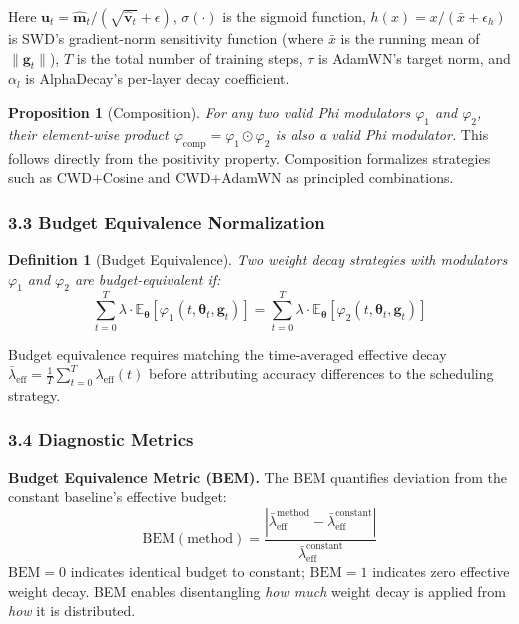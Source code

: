 \documentclass[
]{article}
\begin{document}
Here
\(\mathbf{u}_t = \hat{\mathbf{m}}_t / (\sqrt{\hat{\mathbf{v}}_t} + \epsilon)\),
\(\sigma(\cdot)\) is the sigmoid function,
\(h(x) = x / (\bar{x} + \epsilon_h)\) is SWD's gradient-norm sensitivity
function (where \(\bar{x}\) is the running mean of
\(\|\mathbf{g}_t\|\)), \(T\) is the total number of training steps,
\(\tau\) is AdamWN's target norm, and \(\alpha_l\) is AlphaDecay's
per-layer decay coefficient.

\textbf{Proposition 1} (Composition). \emph{For any two valid Phi
modulators \(\varphi_1\) and \(\varphi_2\), their element-wise product
\(\varphi_{\mathrm{comp}} = \varphi_1 \odot \varphi_2\) is also a valid
Phi modulator.} This follows directly from the positivity property.
Composition formalizes strategies such as CWD+Cosine and CWD+AdamWN as
principled combinations.

\hypertarget{budget-equivalence-normalization}{%
\subsubsection{3.3 Budget Equivalence
Normalization}\label{budget-equivalence-normalization}}

\textbf{Definition 1} (Budget Equivalence). \emph{Two weight decay
strategies with modulators \(\varphi_1\) and \(\varphi_2\) are
budget-equivalent if:} \[
\sum_{t=0}^{T} \lambda \cdot \mathbb{E}_{\boldsymbol{\theta}}[\varphi_1(t, \boldsymbol{\theta}_t, \mathbf{g}_t)] = \sum_{t=0}^{T} \lambda \cdot \mathbb{E}_{\boldsymbol{\theta}}[\varphi_2(t, \boldsymbol{\theta}_t, \mathbf{g}_t)]
\]

Budget equivalence requires matching the time-averaged effective decay
\(\bar{\lambda}_{\mathrm{eff}} = \frac{1}{T}\sum_{t=0}^{T}\lambda_{\mathrm{eff}}(t)\)
before attributing accuracy differences to the scheduling strategy.

\hypertarget{diagnostic-metrics}{%
\subsubsection{3.4 Diagnostic Metrics}\label{diagnostic-metrics}}

\textbf{Budget Equivalence Metric (BEM).} The BEM quantifies deviation
from the constant baseline's effective budget: \[
\mathrm{BEM}(\text{method}) = \frac{|\bar{\lambda}_{\mathrm{eff}}^{\text{method}} - \bar{\lambda}_{\mathrm{eff}}^{\text{constant}}|}{\bar{\lambda}_{\mathrm{eff}}^{\text{constant}}}
\] \(\mathrm{BEM} = 0\) indicates identical budget to constant;
\(\mathrm{BEM} = 1\) indicates zero effective weight decay. BEM enables
disentangling \emph{how much} weight decay is applied from \emph{how} it
is distributed.
\end{document}
